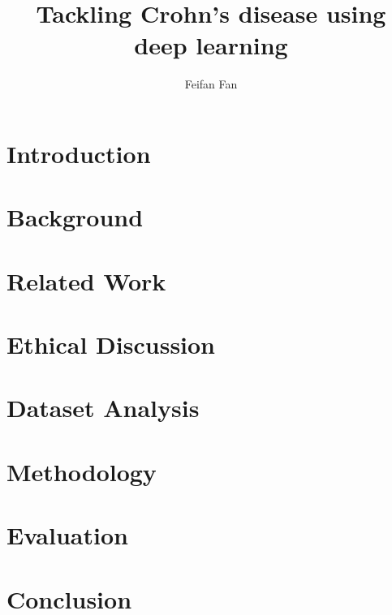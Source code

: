 \documentclass[a4paper,12pt]{report}
\begin{document}
\title{Tackling Crohn's disease using deep learning}
\author{Feifan Fan}





\tableofcontents
\listoffigures

\chapter{Introduction}


\chapter{Background}
\label{cha:background}


\chapter{Related Work}


\chapter{Ethical Discussion}


\chapter{Dataset Analysis}

\chapter{Methodology}
\label{cha:Methodology}


\chapter{Evaluation}
\label{cha:evaluation}


\chapter{Conclusion}
\label{cha:Conclusion}



\end{document}
